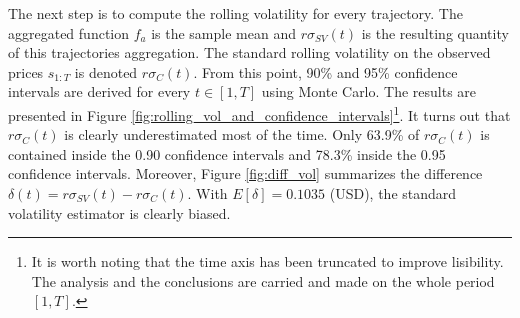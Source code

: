 \documentclass[11pt,a4,twosided,singlespacing,titlepagenumber=on]{scrreprt}
\numberwithin{equation}{chapter} %
\theoremstyle{remark}
\begin{document}
The next step is to compute the rolling volatility for every trajectory. The aggregated function $f_a$ is the sample mean and $r\sigma_{SV}(t)$ is the resulting quantity of this trajectories aggregation. The standard rolling volatility on the observed prices $s_{1:T}$ is denoted $r\sigma_C(t)$. From this point, 90\% and 95\% confidence intervals are derived for every $t \in [1,T]$ using Monte Carlo. The results are presented in Figure \ref{fig:rolling_vol_and_confidence_intervals}\footnote{It is worth noting that the time axis has been truncated to improve lisibility. The analysis and the conclusions are carried and made on the whole period $[1,T]$.}. It turns out that $r\sigma_C(t)$ is clearly underestimated most of the time. Only 63.9\% of $r\sigma_C(t)$ is contained inside the 0.90 confidence intervals and 78.3\% inside the 0.95 confidence intervals. Moreover, Figure \ref{fig:diff_vol} summarizes the difference $\delta(t) = r\sigma_{SV}(t) - r\sigma_C(t)$. With $E[\delta] = 0.1035$ (USD), the standard volatility estimator is clearly biased.
\end{document}
